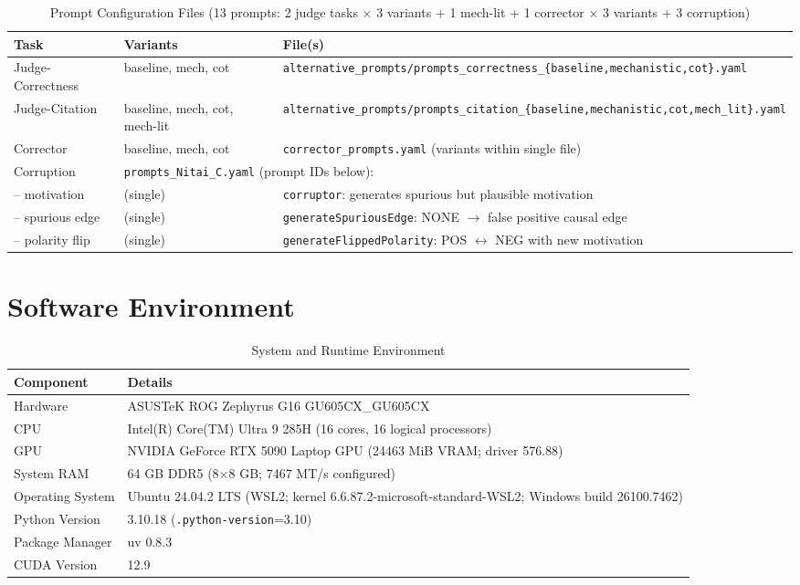 \begin{table}[H]
\centering
\caption{Prompt Configuration Files (13 prompts: 2 judge tasks $\times$ 3 variants + 1 mech-lit + 1 corrector $\times$ 3 variants + 3 corruption)}
\label{tab:prompt_files}
\footnotesize
\begin{tabularx}{\textwidth}{@{}l l X@{}}
\toprule
\textbf{Task} & \textbf{Variants} & \textbf{File(s)} \\
\midrule
Judge-Correctness & baseline, mech, cot & \texttt{alternative\_prompts/prompts\_correctness\_\{baseline,mechanistic,cot\}.yaml} \\
Judge-Citation & baseline, mech, cot, mech-lit & \texttt{alternative\_prompts/prompts\_citation\_\{baseline,mechanistic,cot,mech\_lit\}.yaml} \\
Corrector & baseline, mech, cot & \texttt{corrector\_prompts.yaml} (variants within single file) \\
\midrule
Corruption & \multicolumn{2}{l}{\texttt{prompts\_Nitai\_C.yaml} (prompt IDs below):} \\
\quad -- motivation & (single) & \texttt{corruptor}: generates spurious but plausible motivation \\
\quad -- spurious edge & (single) & \texttt{generateSpuriousEdge}: NONE $\rightarrow$ false positive causal edge \\
\quad -- polarity flip & (single) & \texttt{generateFlippedPolarity}: POS $\leftrightarrow$ NEG with new motivation \\
\bottomrule
\end{tabularx}
\end{table}

\section{Software Environment}
\label{sec:software_env}

\begin{table}[H]
\centering
\caption{System and Runtime Environment}
\label{tab:system_env}
\footnotesize
\begin{tabular}{@{}ll@{}}
\toprule
\textbf{Component} & \textbf{Details} \\
\midrule
Hardware & ASUSTeK ROG Zephyrus G16 GU605CX\_GU605CX \\
CPU & Intel(R) Core(TM) Ultra 9 285H (16 cores, 16 logical processors) \\
GPU & NVIDIA GeForce RTX 5090 Laptop GPU (24463 MiB VRAM; driver 576.88) \\
System RAM & 64 GB DDR5 (8$\times$8 GB; 7467 MT/s configured) \\
Operating System & Ubuntu 24.04.2 LTS (WSL2; kernel 6.6.87.2-microsoft-standard-WSL2; Windows build 26100.7462) \\
Python Version & 3.10.18 (\texttt{.python-version}=3.10) \\
Package Manager & uv 0.8.3 \\
CUDA Version & 12.9 \\
\bottomrule
\end{tabular}
\end{table}

